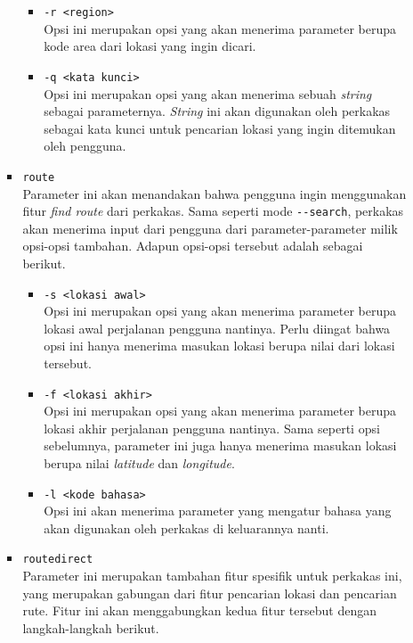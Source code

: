 \documentclass[a4paper,twoside]{article}
\begin{document}
\begin{enumerate}
\begin{itemize}
\begin{itemize}
		\begin{itemize}
			\item \verb|-r <region>|\\
			Opsi ini merupakan opsi yang akan menerima parameter berupa kode area dari lokasi yang ingin dicari.
			\item \verb|-q <kata kunci>|\\
			Opsi ini merupakan opsi yang akan menerima sebuah \textit{string} sebagai parameternya. \textit{String} ini akan digunakan oleh perkakas sebagai kata kunci untuk pencarian lokasi yang ingin ditemukan oleh pengguna.
		\end{itemize}
	
		\item \verb|route|\\
		Parameter ini akan menandakan bahwa pengguna ingin menggunakan fitur \textit{find route} dari perkakas. Sama seperti mode \verb|--search|, perkakas akan menerima input dari pengguna dari parameter-parameter milik opsi-opsi tambahan. Adapun opsi-opsi tersebut adalah sebagai berikut.
		
		\begin{itemize}
			\item \verb|-s <lokasi awal>|\\
			Opsi ini merupakan opsi yang akan menerima parameter berupa lokasi awal perjalanan pengguna nantinya. Perlu diingat bahwa opsi ini hanya menerima masukan lokasi berupa nilai \latlon dari lokasi tersebut.
			\item \verb|-f <lokasi akhir>|\\
			Opsi ini merupakan opsi yang akan menerima parameter berupa lokasi akhir perjalanan pengguna nantinya. Sama seperti opsi sebelumnya, parameter ini juga hanya menerima masukan lokasi berupa nilai \textit{latitude} dan \textit{longitude}.
			\item \verb|-l <kode bahasa>|\\
			Opsi ini akan menerima parameter yang mengatur bahasa yang akan digunakan oleh perkakas di keluarannya nanti.
		\end{itemize}
		
		\item \verb|routedirect|\\
		Parameter ini merupakan tambahan fitur spesifik untuk perkakas ini, yang merupakan \linebreak gabungan dari fitur pencarian lokasi dan pencarian rute. Fitur ini akan menggabungkan kedua fitur tersebut dengan langkah-langkah berikut.
		

\end{itemize}
\end{itemize}
\end{enumerate}
\end{document}
